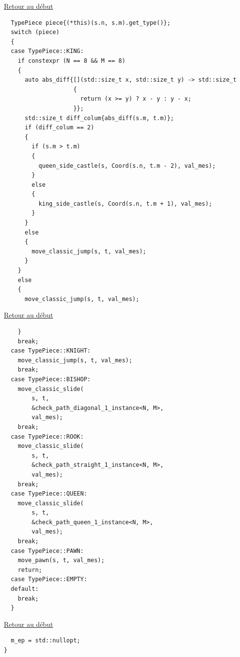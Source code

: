 {\begin{frame}[fragile]
\hyperlink{conclusion}{Retour au début}\newline
\begin{verbatim}
  TypePiece piece{(*this)(s.n, s.m).get_type()};
  switch (piece)
  {
  case TypePiece::KING:
    if constexpr (N == 8 && M == 8)
    {
      auto abs_diff{[](std::size_t x, std::size_t y) -> std::size_t
                    {
                      return (x >= y) ? x - y : y - x;
                    }};
      std::size_t diff_colum{abs_diff(s.m, t.m)};
      if (diff_colum == 2)
      {
        if (s.m > t.m)
        {
          queen_side_castle(s, Coord(s.n, t.m - 2), val_mes);
        }
        else
        {
          king_side_castle(s, Coord(s.n, t.m + 1), val_mes);
        }
      }
      else
      {
        move_classic_jump(s, t, val_mes);
      }
    }
    else
    {
      move_classic_jump(s, t, val_mes);
\end{verbatim}
\end{frame}

\begin{frame}[fragile]
\hyperlink{conclusion}{Retour au début}\newline
\begin{verbatim}
    }
    break;
  case TypePiece::KNIGHT:
    move_classic_jump(s, t, val_mes);
    break;
  case TypePiece::BISHOP:
    move_classic_slide(
        s, t,
        &check_path_diagonal_1_instance<N, M>,
        val_mes);
    break;
  case TypePiece::ROOK:
    move_classic_slide(
        s, t,
        &check_path_straight_1_instance<N, M>,
        val_mes);
    break;
  case TypePiece::QUEEN:
    move_classic_slide(
        s, t,
        &check_path_queen_1_instance<N, M>,
        val_mes);
    break;
  case TypePiece::PAWN:
    move_pawn(s, t, val_mes);
    return;
  case TypePiece::EMPTY:
  default:
    break;
  }
\end{verbatim}
\end{frame}

\begin{frame}[fragile]
\hyperlink{conclusion}{Retour au début}\newline
\begin{verbatim}
  m_ep = std::nullopt;
}


\end{verbatim}
\end{frame}}
